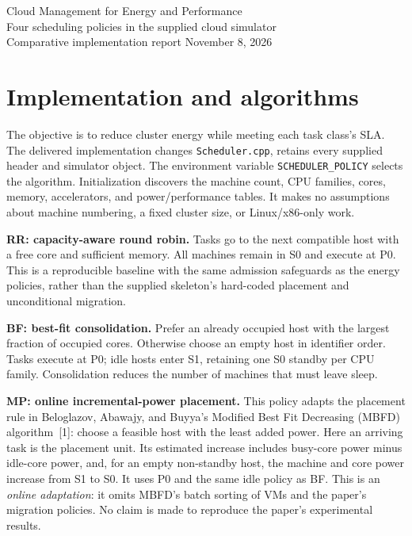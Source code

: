 \documentclass[10pt,letterpaper]{article}
\begin{document}
\begin{center}
{\Large Cloud Management for Energy and Performance}\\[4pt]
{\large Four scheduling policies in the supplied cloud simulator}\\[3pt]
Comparative implementation report \quad November 8, 2026
\end{center}

\section*{Implementation and algorithms}
The objective is to reduce cluster energy while meeting each task class's SLA.
The delivered implementation changes \texttt{Scheduler.cpp}, retains every supplied
header and simulator object. The environment variable
\texttt{SCHEDULER\_POLICY} selects the algorithm. Initialization discovers the machine count, CPU families,
cores, memory, accelerators, and power/performance tables. It makes no assumptions
about machine numbering, a fixed cluster size, or Linux/x86-only work.

\textbf{RR: capacity-aware round robin.} Tasks go to the next compatible host
with a free core and sufficient memory. All machines remain in S0 and execute at
P0. This is a reproducible baseline with the same admission safeguards as the
energy policies, rather than the supplied skeleton's hard-coded placement and
unconditional migration.

\textbf{BF: best-fit consolidation.} Prefer an already occupied host with the
largest fraction of occupied cores. Otherwise choose an empty host in identifier
order. Tasks execute at P0; idle hosts enter S1, retaining one S0 standby per CPU
family. Consolidation reduces the number of machines that must leave sleep.

\textbf{MP: online incremental-power placement.} This policy adapts the placement
rule in Beloglazov, Abawajy, and Buyya's Modified Best Fit Decreasing (MBFD)
algorithm~[1]: choose a feasible host with the least added power. Here an arriving
task is the placement unit. Its estimated increase includes busy-core power minus
idle-core power, and, for an empty non-standby host, the machine and core power
increase from S1 to S0. It uses P0 and the same idle policy as BF. This is an
\emph{online adaptation}: it omits MBFD's batch sorting of VMs and the paper's
migration policies. No claim is made to reproduce the paper's experimental results.
\end{document}
